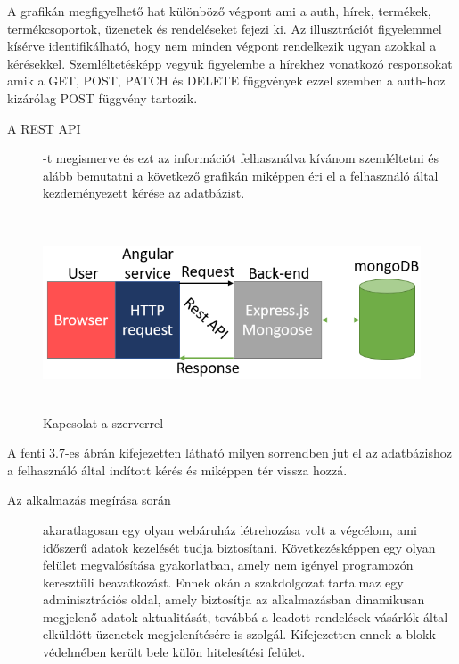  A grafikán megfigyelhető hat különböző végpont ami a auth, hírek, termékek, termékcsoportok, üzenetek és rendeléseket fejezi ki. Az illusztrációt figyelemmel kísérve identifikálható, hogy nem minden végpont rendelkezik ugyan azokkal a kérésekkel. Szemléltetésképp vegyük figyelembe a hírekhez vonatkozó responsokat amik a GET, POST, PATCH és DELETE függvények ezzel szemben a auth-hoz kizárólag POST függvény tartozik.

\begin{description}
	\item[A REST API]-t megismerve és ezt az információt felhasználva kívánom szemléltetni és alább bemutatni a következő grafikán miképpen éri el a felhasználó által kezdeményezett kérése az adatbázist.
\end{description}

\begin{figure}[H]
	\centering
	\includegraphics[width=1.0\textwidth,height=220px]{images/kapcsolat_szerver_bemutatas.png}
	\caption{Kapcsolat a szerverrel}
	\label{fig.picture-7}
\end{figure}

A fenti 3.7-es ábrán kifejezetten látható milyen sorrendben jut el az adatbázishoz a felhasználó által indított kérés és miképpen tér vissza hozzá.

\begin{description}
	\item[Az alkalmazás megírása során] akaratlagosan egy olyan webáruház létrehozása volt a végcélom, ami időszerű adatok kezelését tudja biztosítani. Következésképpen egy olyan felület megvalósítása gyakorlatban, amely nem igényel programozón keresztüli beavatkozást. Ennek okán a szakdolgozat tartalmaz egy adminisztrációs oldal, amely biztosítja az alkalmazásban dinamikusan megjelenő adatok aktualitását, továbbá a leadott rendelések vásárlók által elküldött üzenetek megjelenítésére is szolgál. Kifejezetten ennek a blokk védelmében került bele külön hitelesítési felület.
\end{description}
 
